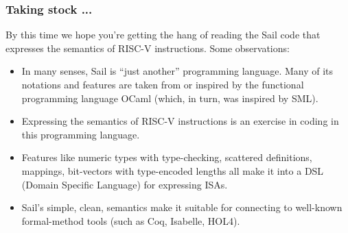 \documentclass[aspectratio=169]{beamer}
\newcommand{\slidefont}{\scriptsize}
\begin{document}
\begin{frame}[fragile]
  \frametitle{Taking stock ...}

  \slidefont

  By this time we hope you're getting the hang of reading the Sail
  code that expresses the semantics of RISC-V instructions.  Some
  observations:
  
  \begin{itemize}
    \item In many senses, Sail is ``just another'' programming
      language.  Many of its notations and features are taken from or
      inspired by the functional programming language OCaml (which, in
      turn, was inspired by SML).

    \item Expressing the semantics of RISC-V instructions is an
      exercise in coding in this programming language.

    \item Features like numeric types with type-checking, scattered
      definitions, mappings, bit-vectors with type-encoded lengths all
      make it into a DSL (Domain Specific Language) for expressing
      ISAs.

    \item Sail's simple, clean, semantics make it suitable for
      connecting to well-known formal-method tools (such as Coq,
      Isabelle, HOL4).

  \end{itemize}

\end{frame}

\end{document}

